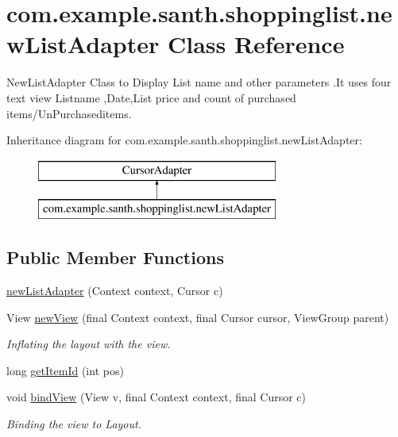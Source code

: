 \hypertarget{classcom_1_1example_1_1santh_1_1shoppinglist_1_1new_list_adapter}{}\section{com.\+example.\+santh.\+shoppinglist.\+new\+List\+Adapter Class Reference}
\label{classcom_1_1example_1_1santh_1_1shoppinglist_1_1new_list_adapter}


New\+List\+Adapter Class to Display List name and other parameters .It uses four text view Listname ,Date,List price and count of purchased items/\+Un\+Purchaseditems.  


Inheritance diagram for com.\+example.\+santh.\+shoppinglist.\+new\+List\+Adapter\+:\begin{figure}[H]
\begin{center}
\leavevmode
\includegraphics[height=2.000000cm]{classcom_1_1example_1_1santh_1_1shoppinglist_1_1new_list_adapter}
\end{center}
\end{figure}
\subsection*{Public Member Functions}
\begin{DoxyCompactItemize}
\item 
\hyperlink{classcom_1_1example_1_1santh_1_1shoppinglist_1_1new_list_adapter_a6588c4f209fa421cf412c9179694dfa2}{new\+List\+Adapter} (Context context, Cursor c)
\item 
View \hyperlink{classcom_1_1example_1_1santh_1_1shoppinglist_1_1new_list_adapter_aba836d3e18b7f55004be894a8bb11824}{new\+View} (final Context context, final Cursor cursor, View\+Group parent)
\begin{DoxyCompactList}\small\item\em Inflating the layout with the view. \end{DoxyCompactList}\item 
long \hyperlink{classcom_1_1example_1_1santh_1_1shoppinglist_1_1new_list_adapter_ad73c83f0b3e981b191e8ff6185d8c5a4}{get\+Item\+Id} (int pos)
\item 
void \hyperlink{classcom_1_1example_1_1santh_1_1shoppinglist_1_1new_list_adapter_a44d6e78584f2ef7351061206f467e0b3}{bind\+View} (View v, final Context context, final Cursor c)
\begin{DoxyCompactList}\small\item\em Binding the view to Layout. \end{DoxyCompactList}\end{DoxyCompactItemize}



